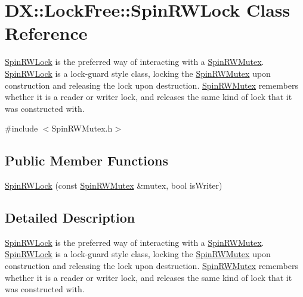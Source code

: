 \hypertarget{class_d_x_1_1_lock_free_1_1_spin_r_w_lock}{\section{D\-X\-:\-:Lock\-Free\-:\-:Spin\-R\-W\-Lock Class Reference}
\label{class_d_x_1_1_lock_free_1_1_spin_r_w_lock}
}


\hyperlink{class_d_x_1_1_lock_free_1_1_spin_r_w_lock}{Spin\-R\-W\-Lock} is the preferred way of interacting with a \hyperlink{class_d_x_1_1_lock_free_1_1_spin_r_w_mutex}{Spin\-R\-W\-Mutex}. \hyperlink{class_d_x_1_1_lock_free_1_1_spin_r_w_lock}{Spin\-R\-W\-Lock} is a lock-\/guard style class, locking the \hyperlink{class_d_x_1_1_lock_free_1_1_spin_r_w_mutex}{Spin\-R\-W\-Mutex} upon construction and releasing the lock upon destruction. \hyperlink{class_d_x_1_1_lock_free_1_1_spin_r_w_mutex}{Spin\-R\-W\-Mutex} remembers whether it is a reader or writer lock, and releases the same kind of lock that it was constructed with.  




{\ttfamily \#include $<$Spin\-R\-W\-Mutex.\-h$>$}

\subsection*{Public Member Functions}
\begin{DoxyCompactItemize}
\item 
\hyperlink{class_d_x_1_1_lock_free_1_1_spin_r_w_lock_a079aadf792b936cee1e94e9f3870e1ba}{Spin\-R\-W\-Lock} (const \hyperlink{class_d_x_1_1_lock_free_1_1_spin_r_w_mutex}{Spin\-R\-W\-Mutex} \&mutex, bool is\-Writer)
\end{DoxyCompactItemize}


\subsection{Detailed Description}
\hyperlink{class_d_x_1_1_lock_free_1_1_spin_r_w_lock}{Spin\-R\-W\-Lock} is the preferred way of interacting with a \hyperlink{class_d_x_1_1_lock_free_1_1_spin_r_w_mutex}{Spin\-R\-W\-Mutex}. \hyperlink{class_d_x_1_1_lock_free_1_1_spin_r_w_lock}{Spin\-R\-W\-Lock} is a lock-\/guard style class, locking the \hyperlink{class_d_x_1_1_lock_free_1_1_spin_r_w_mutex}{Spin\-R\-W\-Mutex} upon construction and releasing the lock upon destruction. \hyperlink{class_d_x_1_1_lock_free_1_1_spin_r_w_mutex}{Spin\-R\-W\-Mutex} remembers whether it is a reader or writer lock, and releases the same kind of lock that it was constructed with. 

